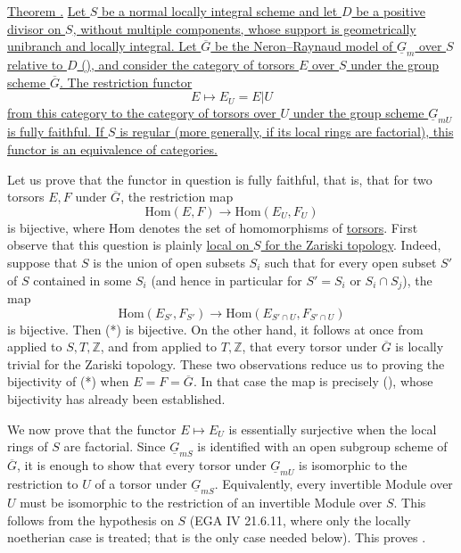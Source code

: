 
\medskip
\noindent\underline{Theorem .}  \underline{Let $S$ be a normal locally
integral scheme and let $D$ be a positive divisor on $S$, without multiple
components, whose support is geometrically unibranch and locally integral.
Let $\overline G$ be the Neron--Raynaud model of $\underline G_m$ over $S$
relative to $D$ (), and consider the category of torsors $E$ over $S$
under the group scheme $\overline G$.  The restriction functor}
\[
 E\longmapsto E_U=E|U
\]
\underline{from this category to the category of torsors over $U$ under the
group scheme $\underline G_{mU}$ is fully faithful.  If $S$ is regular (more
generally, if its local rings are factorial), this functor is an equivalence
of categories.}

Let us prove that the functor in question is fully faithful, that is, that
for two torsors $E,F$ under $\overline G$, the restriction map
\begin{equation}\tag{*}
 \mathrm{Hom}(E,F)\longrightarrow\mathrm{Hom}(E_U,F_U)
\end{equation}
is bijective, where $\mathrm{Hom}$ denotes the set of homomorphisms of
\underline{torsors}.  First observe that this question is plainly
\underline{local on $S$ for the Zariski topology}.  Indeed, suppose that
$S$ is the union of open subsets $S_i$ such that for every open subset $S'$
of $S$ contained in some $S_i$ (and hence in particular for $S'=S_i$ or
$S_i\cap S_j$), the map
\[
 \mathrm{Hom}(E_{S'},F_{S'})
 \longrightarrow
 \mathrm{Hom}(E_{S'\cap U},F_{S'\cap U})
\]
is bijective.  Then (*) is bijective.  On the other hand, it follows at once
from  applied to $S,T,\mathbb Z$, and from  applied to $T,\mathbb Z$,
that every torsor under $\overline G$ is locally trivial for the Zariski
topology.  These two observations reduce us to proving the bijectivity of
(*) when $E=F=\overline G$.  In that case the map is precisely (),
whose bijectivity has already been established.

We now prove that the functor $E\mapsto E_U$ is essentially surjective when
the local rings of $S$ are factorial.  Since $\underline G_{mS}$ is
identified with an open subgroup scheme of $\overline G$, it is enough to
show that every torsor under $\underline G_{mU}$ is isomorphic to the
restriction to $U$ of a torsor under $\underline G_{mS}$.  Equivalently,
every invertible Module over $U$ must be isomorphic to the restriction of an
invertible Module over $S$.  This follows from the hypothesis on $S$
(EGA IV 21.6.11, where only the locally noetherian case is treated; that is
the only case needed below).  This proves .

